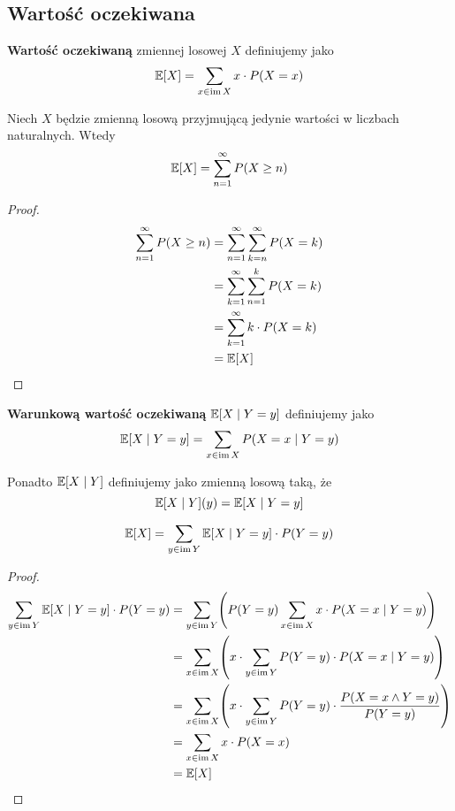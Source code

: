 \subsection{Wartość oczekiwana}
\begin{definition}
	\textbf{Wartość oczekiwaną} zmiennej losowej \( X \) definiujemy jako
	\[
		\expected{X} = \sum_{x \in \im X} x \cdot P(X = x)
	\]
\end{definition}
\begin{theorem}[Lemat 2.9 P\&C]
	\label{expected-value-of-natural-random-variable}
	Niech \( X \) będzie zmienną losową przyjmującą jedynie wartości w liczbach naturalnych. Wtedy
	\[
		\expected{X} = \sum_{n=1}^\infty P(X \geq n)
	\]
\end{theorem}
\begin{proof}
	\begin{align*}
		\sum_{n=1}^\infty P(X \geq n)
		 & = \sum_{n=1}^\infty \sum_{k=n}^\infty P(X = k) \\
		 & = \sum_{k=1}^\infty \sum_{n=1}^k P(X = k)      \\
		 & = \sum_{k=1}^\infty k \cdot P(X = k)           \\
		 & = \expected{X}
	\end{align*}
\end{proof}

\begin{definition}
	\textbf{Warunkową wartość oczekiwaną} \( \expected{X \mid Y = y} \) definiujemy jako
	\[
		\expected{X \mid Y = y} = \sum_{x \in \im X} P\pars{X = x \mid Y = y}
	\]

	Ponadto \( \expected{X \mid Y} \) definiujemy jako zmienną losową taką, że
	\[
		\expected{X \mid Y}(y) = \expected{X \mid Y = y}
	\]
\end{definition}

\begin{lemma}
	\[
		\expected{X} = \sum_{y \in \im Y} \expected{X \mid Y = y} \cdot P(Y = y)
	\]
\end{lemma}
\begin{proof}
	\begin{align*}
		\sum_{y \in \im Y} \expected{X \mid Y = y} \cdot P(Y = y)
		 & = \sum_{y \in \im Y} \pars{P(Y = y) \sum_{x \in \im X} x \cdot P(X = x \mid Y = y)}       \\
		 & = \sum_{x \in \im X} \pars{x \cdot \sum_{y \in \im Y}P(Y = y)  \cdot P(X = x \mid Y = y)} \\
		 & = \sum_{x \in \im X} \pars{x \cdot \sum_{y \in \im Y}P(Y = y)  \cdot
		\frac{P(X = x \land Y = y)}{P(Y = y)}}                                                       \\
		 & = \sum_{x \in \im X} x \cdot P(X = x)                                                     \\
		 & = \expected{X}
	\end{align*}
\end{proof}

